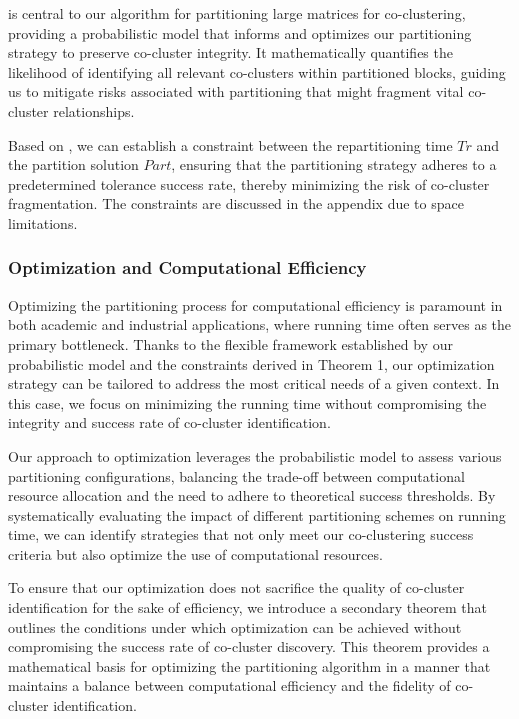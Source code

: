 \documentclass[journal]{IEEEtran}
\begin{document}
 is central to our algorithm for partitioning large matrices for co-clustering, providing a probabilistic model that informs and optimizes our partitioning strategy to preserve co-cluster integrity. It mathematically quantifies the likelihood of identifying all relevant co-clusters within partitioned blocks, guiding us to mitigate risks associated with partitioning that might fragment vital co-cluster relationships.

Based on , we can establish a constraint between the repartitioning time $Tr$ and the partition solution $Part$, ensuring that the partitioning strategy adheres to a predetermined tolerance success rate, thereby minimizing the risk of co-cluster fragmentation. The constraints are discussed in the appendix due to space limitations.

\subsubsection{Optimization and Computational Efficiency}

Optimizing the partitioning process for computational efficiency is paramount in both academic and industrial applications, where running time often serves as the primary bottleneck. Thanks to the flexible framework established by our probabilistic model and the constraints derived in Theorem 1, our optimization strategy can be tailored to address the most critical needs of a given context. In this case, we focus on minimizing the running time without compromising the integrity and success rate of co-cluster identification.

Our approach to optimization leverages the probabilistic model to assess various partitioning configurations, balancing the trade-off between computational resource allocation and the need to adhere to theoretical success thresholds. By systematically evaluating the impact of different partitioning schemes on running time, we can identify strategies that not only meet our co-clustering success criteria but also optimize the use of computational resources.

To ensure that our optimization does not sacrifice the quality of co-cluster identification for the sake of efficiency, we introduce a secondary theorem that outlines the conditions under which optimization can be achieved without compromising the success rate of co-cluster discovery. This theorem provides a mathematical basis for optimizing the partitioning algorithm in a manner that maintains a balance between computational efficiency and the fidelity of co-cluster identification.
\end{document}
